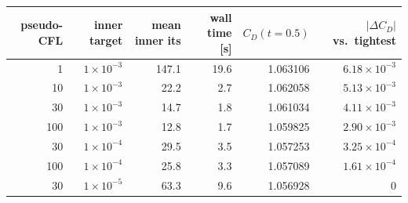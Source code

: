 \footnotesize
\begin{tabular}{rrrrrr}
\toprule
pseudo-CFL & inner target & mean inner its & wall time [s] & $C_D(t=0.5)$ & $|\Delta C_D|$ vs.\ tightest\\
\midrule
1 & $1\times 10^{-3}$ & 147.1 & 19.6 & 1.063106 & $6.18\times 10^{-3}$\\
10 & $1\times 10^{-3}$ & 22.2 & 2.7 & 1.062058 & $5.13\times 10^{-3}$\\
30 & $1\times 10^{-3}$ & 14.7 & 1.8 & 1.061034 & $4.11\times 10^{-3}$\\
100 & $1\times 10^{-3}$ & 12.8 & 1.7 & 1.059825 & $2.90\times 10^{-3}$\\
30 & $1\times 10^{-4}$ & 29.5 & 3.5 & 1.057253 & $3.25\times 10^{-4}$\\
100 & $1\times 10^{-4}$ & 25.8 & 3.3 & 1.057089 & $1.61\times 10^{-4}$\\
30 & $1\times 10^{-5}$ & 63.3 & 9.6 & 1.056928 & 0\\
\bottomrule
\end{tabular}
